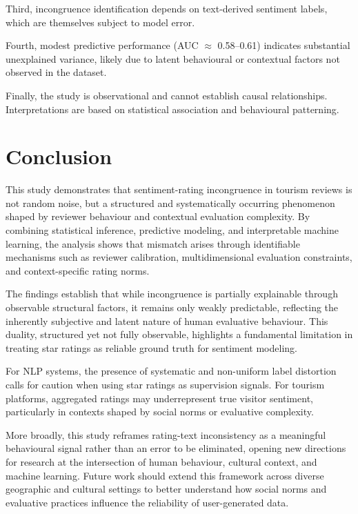 \documentclass[conference]{IEEEtran}
\begin{document}
Third, incongruence identification depends on text-derived sentiment labels, which are themselves subject to model error.

Fourth, modest predictive performance (AUC $\approx$ 0.58--0.61) indicates substantial unexplained variance, likely due to latent behavioural or contextual factors not observed in the dataset.

Finally, the study is observational and cannot establish causal relationships. Interpretations are based on statistical association and behavioural patterning.

\section{Conclusion}
This study demonstrates that sentiment-rating incongruence in tourism reviews is not random noise, but a structured and systematically occurring phenomenon shaped by reviewer behaviour and contextual evaluation complexity. By combining statistical inference, predictive modeling, and interpretable machine learning, the analysis shows that mismatch arises through identifiable mechanisms such as reviewer calibration, multidimensional evaluation constraints, and context-specific rating norms.

The findings establish that while incongruence is partially explainable through observable structural factors, it remains only weakly predictable, reflecting the inherently subjective and latent nature of human evaluative behaviour. This duality, structured yet not fully observable, highlights a fundamental limitation in treating star ratings as reliable ground truth for sentiment modeling.

For NLP systems, the presence of systematic and non-uniform label distortion calls for caution when using star ratings as supervision signals. For tourism platforms, aggregated ratings may underrepresent true visitor sentiment, particularly in contexts shaped by social norms or evaluative complexity.

More broadly, this study reframes rating-text inconsistency as a meaningful behavioural signal rather than an error to be eliminated, opening new directions for research at the intersection of human behaviour, cultural context, and machine learning. Future work should extend this framework across diverse geographic and cultural settings to better understand how social norms and evaluative practices influence the reliability of user-generated data.



\end{document}
